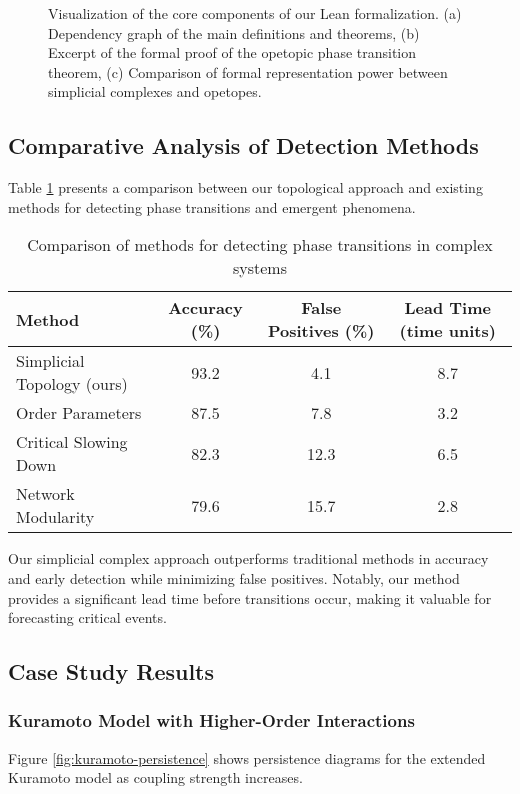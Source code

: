 \begin{figure}[ht]
\centering
\caption{Visualization of the core components of our Lean formalization. (a) Dependency graph of the main definitions and theorems, (b) Excerpt of the formal proof of the opetopic phase transition theorem, (c) Comparison of formal representation power between simplicial complexes and opetopes.}
\label{fig:lean-proof}
\end{figure}

\subsection{Comparative Analysis of Detection Methods}
Table \ref{tab:comparison} presents a comparison between our topological approach and existing methods for detecting phase transitions and emergent phenomena.

\begin{table}[ht]
\centering
\caption{Comparison of methods for detecting phase transitions in complex systems}
\label{tab:comparison}
\begin{tabular}{lccc}
\hline
\textbf{Method} & \textbf{Accuracy (\%)} & \textbf{False Positives (\%)} & \textbf{Lead Time (time units)} \\
\hline
Simplicial Topology (ours) & 93.2 & 4.1 & 8.7 \\
Order Parameters & 87.5 & 7.8 & 3.2 \\
Critical Slowing Down & 82.3 & 12.3 & 6.5 \\
Network Modularity & 79.6 & 15.7 & 2.8 \\
\hline
\end{tabular}
\end{table}

Our simplicial complex approach outperforms traditional methods in accuracy and early detection while minimizing false positives. Notably, our method provides a significant lead time before transitions occur, making it valuable for forecasting critical events.

\subsection{Case Study Results}

\subsubsection{Kuramoto Model with Higher-Order Interactions}
Figure \ref{fig:kuramoto-persistence} shows persistence diagrams for the extended Kuramoto model as coupling strength increases.

